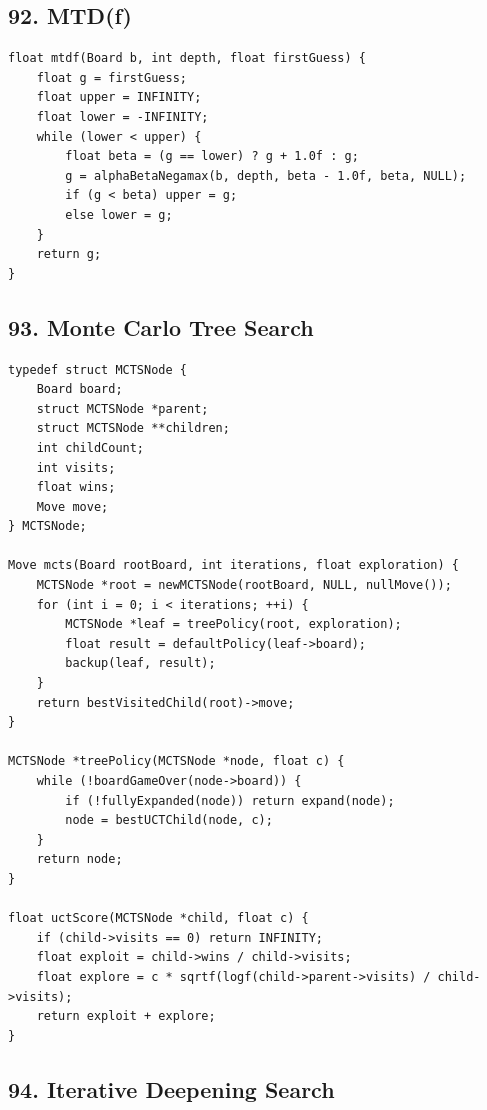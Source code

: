 \documentclass[10pt,letterpaper]{article}
\begin{document}
\subsection*{92. MTD(f)}
{}

\begin{verbatim}
float mtdf(Board b, int depth, float firstGuess) {
    float g = firstGuess;
    float upper = INFINITY;
    float lower = -INFINITY;
    while (lower < upper) {
        float beta = (g == lower) ? g + 1.0f : g;
        g = alphaBetaNegamax(b, depth, beta - 1.0f, beta, NULL);
        if (g < beta) upper = g;
        else lower = g;
    }
    return g;
}
\end{verbatim}

\subsection*{93. Monte Carlo Tree Search}
{}

\begin{verbatim}
typedef struct MCTSNode {
    Board board;
    struct MCTSNode *parent;
    struct MCTSNode **children;
    int childCount;
    int visits;
    float wins;
    Move move;
} MCTSNode;

Move mcts(Board rootBoard, int iterations, float exploration) {
    MCTSNode *root = newMCTSNode(rootBoard, NULL, nullMove());
    for (int i = 0; i < iterations; ++i) {
        MCTSNode *leaf = treePolicy(root, exploration);
        float result = defaultPolicy(leaf->board);
        backup(leaf, result);
    }
    return bestVisitedChild(root)->move;
}

MCTSNode *treePolicy(MCTSNode *node, float c) {
    while (!boardGameOver(node->board)) {
        if (!fullyExpanded(node)) return expand(node);
        node = bestUCTChild(node, c);
    }
    return node;
}

float uctScore(MCTSNode *child, float c) {
    if (child->visits == 0) return INFINITY;
    float exploit = child->wins / child->visits;
    float explore = c * sqrtf(logf(child->parent->visits) / child->visits);
    return exploit + explore;
}
\end{verbatim}

\subsection*{94. Iterative Deepening Search}
{}
\end{document}
